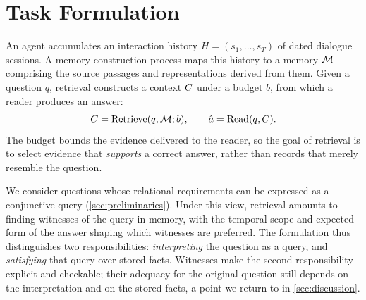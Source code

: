 \section{Task Formulation}
\label{sec:problem}

An agent accumulates an interaction history $H=(s_1,\ldots,s_T)$ of dated
dialogue sessions. A memory construction process maps this history to a
memory $\mathcal{M}$ comprising the source passages and representations derived
from them. Given a question $q$, retrieval constructs a context $C$
under a budget $b$, from which a reader produces an answer:
\begin{equation}
 C=\mathrm{Retrieve}(q,\mathcal{M};b),\qquad
 \hat a=\mathrm{Read}(q,C).
 \label{eq:task}
\end{equation}
The budget bounds the evidence delivered to the reader, so the goal of
retrieval is to select evidence that \emph{supports} a correct answer,
rather than records that merely resemble the question.

We consider questions whose relational requirements can be expressed as
a conjunctive query (\cref{sec:preliminaries}). Under this view,
retrieval amounts to finding witnesses of the query in memory, with the
temporal scope and expected form of the answer shaping which witnesses
are preferred. The formulation thus distinguishes two responsibilities:
\emph{interpreting} the question as a query, and \emph{satisfying} that
query over stored facts. Witnesses make the second responsibility
explicit and checkable; their adequacy for the original question still
depends on the interpretation and on the stored facts, a point we return
to in \cref{sec:discussion}.
